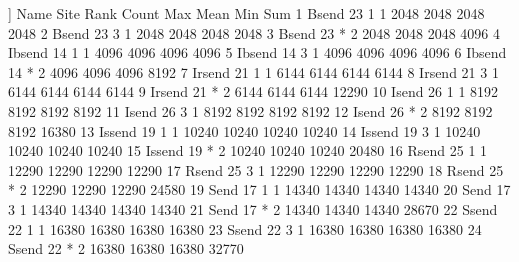 \begin{Output}
[[6]]
     Name Site Rank Count   Max  Mean   Min   Sum
1   Bsend   23    1     1  2048  2048  2048  2048
2   Bsend   23    3     1  2048  2048  2048  2048
3   Bsend   23    *     2  2048  2048  2048  4096
4  Ibsend   14    1     1  4096  4096  4096  4096
5  Ibsend   14    3     1  4096  4096  4096  4096
6  Ibsend   14    *     2  4096  4096  4096  8192
7  Irsend   21    1     1  6144  6144  6144  6144
8  Irsend   21    3     1  6144  6144  6144  6144
9  Irsend   21    *     2  6144  6144  6144 12290
10  Isend   26    1     1  8192  8192  8192  8192
11  Isend   26    3     1  8192  8192  8192  8192
12  Isend   26    *     2  8192  8192  8192 16380
13 Issend   19    1     1 10240 10240 10240 10240
14 Issend   19    3     1 10240 10240 10240 10240
15 Issend   19    *     2 10240 10240 10240 20480
16  Rsend   25    1     1 12290 12290 12290 12290
17  Rsend   25    3     1 12290 12290 12290 12290
18  Rsend   25    *     2 12290 12290 12290 24580
19   Send   17    1     1 14340 14340 14340 14340
20   Send   17    3     1 14340 14340 14340 14340
21   Send   17    *     2 14340 14340 14340 28670
22  Ssend   22    1     1 16380 16380 16380 16380
23  Ssend   22    3     1 16380 16380 16380 16380
24  Ssend   22    *     2 16380 16380 16380 32770
\end{Output}

